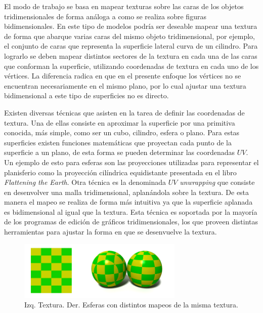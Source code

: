El modo de trabajo se basa en mapear texturas sobre las caras de los objetos tridimensionales de forma análoga a como se realiza sobre figuras bidimensionales. En este tipo de modelos podría ser deseable mapear una textura de forma que abarque varias caras del mismo objeto tridimensional, por ejemplo, el conjunto de caras que representa la superficie lateral curva de un cilindro. Para lograrlo se deben mapear distintos sectores de la textura en cada una de las caras que conforman la superficie, utilizando coordenadas de textura en cada uno de los vértices.
La diferencia radica en que en el presente enfoque los vértices no se encuentran necesariamente en el mismo plano, por lo cual ajustar una textura bidimensional a este tipo de superficies no es directo.

Existen diversas técnicas que asisten en la tarea de definir las coordenadas de textura.
Una de ellas consiste en aproximar la superficie por una primitiva conocida, más simple, como ser un cubo, cilindro, esfera o plano. Para estas superficies existen funciones matemáticas que proyectan cada punto de la superficie a un plano, de esta forma se pueden determinar las coordenadas $UV$.
Un ejemplo de esto para esferas son las proyecciones utilizadas para representar el planisferio como la proyección cilíndrica equidistante presentada en el libro \emph{Flattening the Earth\cite{flatteningTheEarth}}.
Otra técnica es la denominada $UV$ \emph{unwrapping} que consiste en desenvolver una malla tridimensional, aplanándola sobre la textura. De esta manera el mapeo se realiza de forma más intuitiva ya que la superficie aplanada es bidimensional al igual que la textura. Esta técnica es soportada por la mayoría de los programas de edición de gráficos tridimensionales, los que proveen distintas herramientas para ajustar la forma en que se desenvuelve la textura.

\begin{figure}[H]
  \centering
    \includegraphics[width=0.7\textwidth]{./Cap2_videomapping/3dmapping}
  \caption[Imagen propia.]{Izq. Textura. Der. Esferas con distintos mapeos de la misma textura.}
  \label{fig:3dmapping}
\end{figure}

